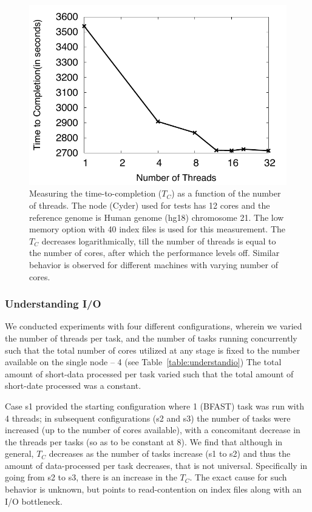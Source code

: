 \documentclass{cpeauth}
\begin{document}
 \begin{figure}
 \centering
\includegraphics[bb=0 0 340 300, scale=0.39]{figures/threadsvstime.pdf} 

\caption{\small Measuring the time-to-completion ($T_C$) as a function of the
  number of threads.  The node (Cyder) used for tests has 12 cores and the reference genome is Human
  genome (hg18) chromosome 21. The low
  memory option with 40 index files is used for this measurement. The
  $T_C$ decreases logarithmically, till the number of
  threads is equal to the number of cores, after which the performance
  levels off. Similar behavior is observed for different machines
  with varying number of cores.}
  \label{fig:threading-benchmark} 
 \end{figure}

\subsubsection{Understanding I/O}

We conducted experiments with four different configurations, wherein
we varied the number of threads per task, and the number of tasks
running concurrently such that the total number of cores utilized at
any stage is fixed to the number available on the single node -- 4
(see Table~\ref{table:understandio}) The total amount of short-data
processed per task varied such that the total amount of short-date
processed was a constant.

Case s1 provided the starting configuration where 1 (BFAST) task was
run with 4 threads; in subsequent configurations (s2 and s3) the
number of tasks were increased (up to the number of cores available),
with a concomitant decrease in the threads per tasks (so as to be
constant at 8). We find that although in general, $T_C$ decreases as
the number of tasks increase (s1 to s2) and thus the amount of
data-processed per task decreases, that is not universal. Specifically
in going from s2 to s3, there is an increase in the $T_C$.  The exact
cause for such behavior is unknown, but points to read-contention on
index files along with an I/O bottleneck.
\end{document}
